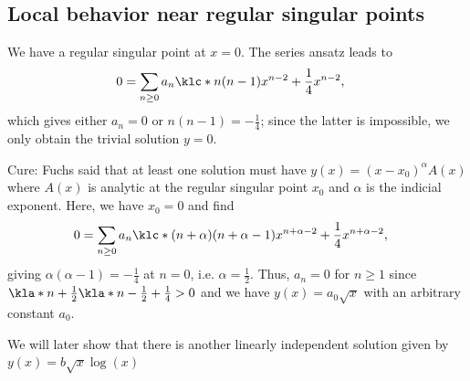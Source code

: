 \documentclass[english, parskip=full]{scrbook}
\newcommand{\note}[1]{\begin{tcolorbox}[colback=colorbackgroundnote,colframe=colornote, breakable,enhanced]#1\end{tcolorbox}}
\newcommand{\example}[3]{\begin{tcolorbox}[colback=colorbackgroundexample,colframe=colorexample, breakable,enhanced,title={\textbf{#1}: #2.}]#3\end{tcolorbox}}
\begin{document}
\subsection{Local behavior near regular singular points}
\example{Taylor series breakdown}{$y'' + \frac{1}{4x^2}y=0$}{We have a regular singular point at $x=0$.
The series ansatz leads to
\begin{align}
0 &= \sum_{n\ge 0} a_n \klc*{n(n-1)x^{n-2} + \frac{1}{4} x^{n-2}},
\end{align}
which gives either $a_n=0$ or $n(n-1)=-\frac{1}{4}$; since the latter is impossible, we only obtain the trivial solution $y=0$.

Cure: Fuchs said that at least one solution must have $y(x)=(x-x_0)^\alpha A(x)$ where $A(x)$ is analytic at the regular singular point $x_0$ and $\alpha$ is the indicial exponent.
Here, we have $x_0=0$ and find
\begin{align}
0 &= \sum_{n\ge 0} a_n \klc*{(n+\alpha)(n+\alpha-1)x^{n+\alpha-2} + \frac{1}{4} x^{n+\alpha-2}},
\end{align}
giving $\alpha(\alpha-1) = -\frac{1}{4}$ at $n=0$, i.e. $\alpha = \frac{1}{2}$.
Thus, $a_n=0$ for $n\ge 1$ since $\kla*{n+\frac{1}{2}} \kla*{n-\frac{1}{2}} + \frac{1}{4} > 0$ and we have $y(x) = a_0\sqrt{x}$ with an arbitrary constant $a_0$.
\note{We will later show that there is another linearly independent solution given by $y(x) = b\sqrt{x} \log(x)$}
}
\end{document}
